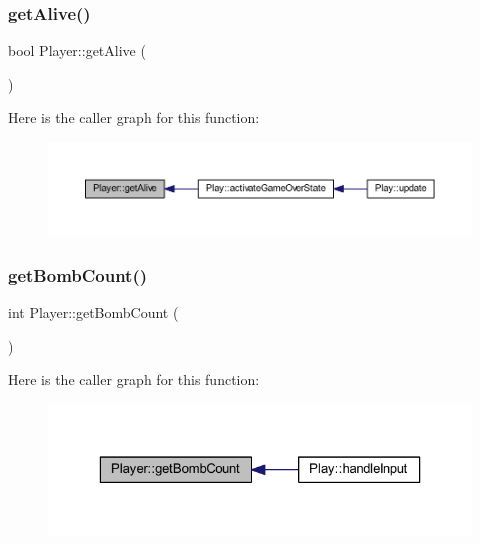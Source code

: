 \subsubsection{\texorpdfstring{get\+Alive()}{getAlive()}}
{\footnotesize\ttfamily bool Player\+::get\+Alive (\begin{DoxyParamCaption}{ }\end{DoxyParamCaption})}

Here is the caller graph for this function\+:
\nopagebreak
\begin{figure}[H]
\begin{center}
\leavevmode
\includegraphics[width=350pt]{class_player_aa45f751e7ba8afcd9894d57ef4813d50_icgraph}
\end{center}
\end{figure}
\mbox{\label{class_player_a83204202817d4d34694a515c85ae3f0d}} 
\subsubsection{\texorpdfstring{get\+Bomb\+Count()}{getBombCount()}}
{\footnotesize\ttfamily int Player\+::get\+Bomb\+Count (\begin{DoxyParamCaption}{ }\end{DoxyParamCaption})}

Here is the caller graph for this function\+:
\nopagebreak
\begin{figure}[H]
\begin{center}
\leavevmode
\includegraphics[width=323pt]{class_player_a83204202817d4d34694a515c85ae3f0d_icgraph}
\end{center}
\end{figure}
\mbox{\label{class_player_a4ad45c4c8298531f45ebed48ce001373}} 
